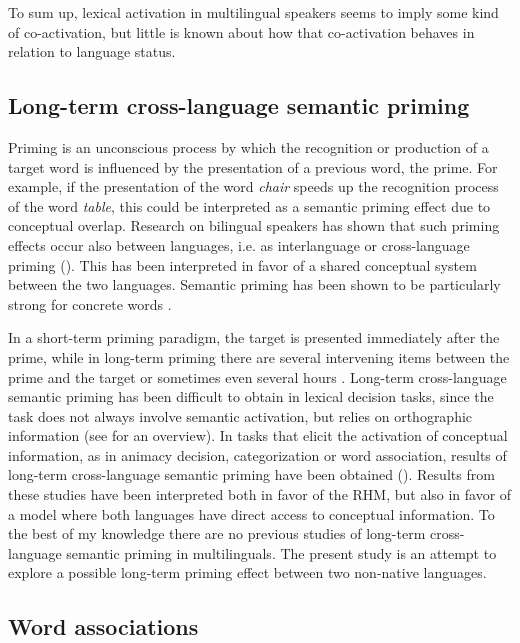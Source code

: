 \documentclass[output=paper,colorlinks,citecolor=brown,nonflat]{langsci/langscibook}
\begin{document}
To sum up, lexical activation in multilingual speakers seems to imply some kind of co-activation, but little is known about how that co-activation behaves in relation to language status.

\subsection{Long-term cross-language semantic priming}\label{sec:gudmundson:1.3}

Priming is an unconscious process by which the recognition or production of a target word is influenced by the presentation of a previous word, the prime. For example, if the presentation of the word \textit{chair} speeds up the recognition process of the word \textit{table}, this could be interpreted as a semantic priming effect due to conceptual overlap. Research on bilingual speakers has shown that such priming effects occur also between languages, i.e. as interlanguage or cross-language priming (\citealt{ChenHo1986, DeGrootNas1991, DuyckEtAl2008, SchoonbaertEtAl2009}). This has been interpreted in favor of a shared conceptual system between the two languages. Semantic priming has been shown to be particularly strong for concrete words \citep{Jin1990}.

In a short-term priming paradigm, the target is presented immediately after the prime, while in long-term priming there are several intervening items between the prime and the target or sometimes even several hours \citep{WagenmakersEtAl2003}. Long-term cross-language semantic priming has been difficult to obtain in lexical decision tasks, since the task does not always involve semantic activation, but relies on orthographic information (see \citealt{GollanKroll2003} for an overview). In tasks that elicit the activation of conceptual information, as in animacy decision, categorization or word association, results of long-term cross-language semantic priming have been obtained (\citealt{ZeelenbergPecher2003, LiEtAl2009, FitzpatrickIzura2011}). Results from these studies have been interpreted both in favor of the RHM, but also in favor of a model where both languages have direct access to conceptual information. To the best of my knowledge there are no previous studies of long-term cross-language semantic priming in multilinguals. The present study is an attempt to explore a possible long-term priming effect between two non-native languages.

\subsection{Word associations}\label{sec:gudmundson:1.4}
\end{document}
